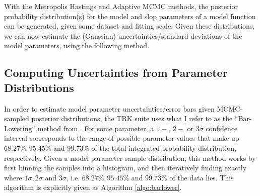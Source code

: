 With the Metropolis Hastings and Adaptive MCMC methods, the posterior probability distribution(s) for the model and slop parameters of a model function can be generated, given some dataset and fitting scale. Given these distributions, we can now estimate the (Gaussian) uncertainties/standard deviations of the model parameters, using the following method.

\subsection{Computing Uncertainties from Parameter Distributions}
\label{sec:barlowering}
In order to estimate model parameter uncertainties/error bars given MCMC-sampled posterior distributions, the TRK suite uses what I refer to as the ``Bar-Lowering`` method from \textcite{trotter}. For some parameter, a $1-$, $2-$ or $3\sigma$ confidence interval corresponds to the range of possible parameter values that make up $68.27\%, 95.45\%$ and $99.73\%$ of the total integrated probability distribution, respectively. Given a model parameter sample distribution, this method works by first binning the samples into a histogram, and then iteratively finding exactly where $1\sigma, 2\sigma$ and $3\sigma$, i.e. $68.27\%, 95.45\%$ and $99.73\%$ of the data lies. This algorithm is explicitly given as Algorithm \ref{algo:barlower}.

\begin{algorithm}
\label{algo:barlower}
\caption{}
\DontPrintSemicolon
\end{algorithm}

